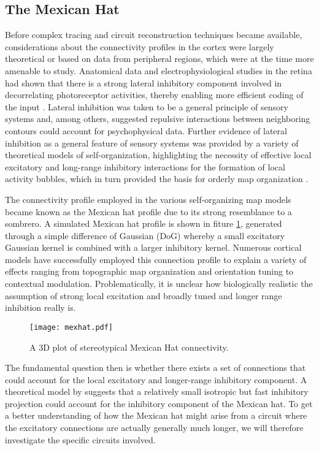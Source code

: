 \subsection{The Mexican Hat} \label{MexicanHat}

Before complex tracing and circuit reconstruction techniques became
available, considerations about the connectivity profiles in the
cortex were largely theoretical or based on data from peripheral
regions, which were at the time more amenable to study. Anatomical
data and electrophysiological studies in the retina had shown that
there is a strong lateral inhibitory component involved in
decorrelating photoreceptor activities, thereby enabling more
efficient coding of the input \citep{Atick1992}. Lateral inhibition
was taken to be a general principle of sensory systems and, among
others, \cite{Blakemore1970} suggested repulsive interactions between
neighboring contours could account for psychophysical data. Further
evidence of lateral inhibition as a general feature of sensory systems
was provided by a variety of theoretical models of self-organization,
highlighting the necessity of effective local excitatory and 
long-range inhibitory interactions for the formation of local activity
bubbles, which in turn provided the basis for orderly map organization
\citep{VonderMalsburg1973,Miller1989}.

The connectivity profile employed in the various self-organizing map
models became known as the Mexican hat profile due to its strong
resemblance to a sombrero. A simulated Mexican hat profile is shown in
fiture \ref{MexHat}, generated through a simple difference of Gaussian (DoG)
whereby a small excitatory Gaussian kernel is combined with a larger
inhibitory kernel. Numerous cortical models have
successfully employed this connection profile to explain a variety of
effects ranging from topographic map organization and orientation tuning
to contextual modulation. Problematically, it is unclear how
biologically realistic the assumption of strong local excitation and
broadly tuned and longer range inhibition really is.

\begin{figure}
	\centering \texttt{[image: mexhat.pdf]}
	\caption{A 3D plot of stereotypical Mexican Hat connectivity.}
	\label{MexHat}
\end{figure}

The fundamental question then is whether there exists a set of
connections that could account for the local excitatory and
longer-range inhibitory component. A theoretical model by
\cite{Kang2003} suggests that a relatively small isotropic but fast
inhibitory projection could account for the inhibitory component of
the Mexican hat. To get a better understanding of how the Mexican hat
might arise from a circuit where the excitatory connections are
actually generally much longer, we will therefore investigate the specific
circuits involved.

